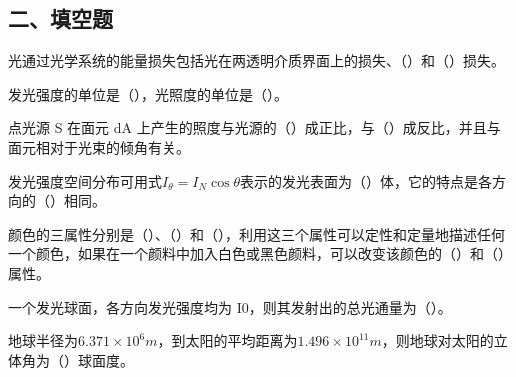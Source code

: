 \documentclass[standard, analysis, notocnum]{ExBook}
\newcommand{\answerarea}[1][8cm]{%
  \par\vspace{2mm}%
  \noindent{\color{themeColor!35}\rule{\linewidth}{0.4pt}}\par
  \noindent\begin{minipage}[t][#1][t]{\linewidth}\vspace{0pt}\end{minipage}\par
  \noindent{\color{themeColor!35}\rule{\linewidth}{0.4pt}}\par
}
\begin{document}
\subsection{二、填空题}
\begin{qitems}
\begin{bbox}
\qitem 光通过光学系统的能量损失包括光在两透明介质界面上的损失、（\hspace{1.6em}）和（\hspace{1.6em}）损失。
\answerarea[3.5cm]
\end{bbox}
\begin{bbox}
\qitem 发光强度的单位是（\hspace{1.6em}），光照度的单位是（\hspace{1.6em}）。
\answerarea[3.5cm]
\end{bbox}
\begin{bbox}
\qitem 点光源 S 在面元 dA 上产生的照度与光源的（\hspace{1.6em}）成正比，与（\hspace{1.6em}）成反比，并且与面元相对于光束的倾角有关。
\answerarea[3.5cm]
\end{bbox}
\begin{bbox}
\qitem 发光强度空间分布可用式$I_{\theta}=I_{N}\cos \theta$表示的发光表面为（\hspace{1.6em}）体，它的特点是各方向的（\hspace{1.6em}）相同。
\answerarea[3.5cm]
\end{bbox}
\begin{bbox}
\qitem 颜色的三属性分别是（\hspace{1.6em}）、（\hspace{1.6em}）和（\hspace{1.6em}），利用这三个属性可以定性和定量地描述任何一个颜色，如果在一个颜料中加入白色或黑色颜料，可以改变该颜色的（\hspace{1.6em}）和（\hspace{1.6em}）属性。
\answerarea[3.5cm]
\end{bbox}
\begin{bbox}
\qitem 一个发光球面，各方向发光强度均为 I0，则其发射出的总光通量为（\hspace{1.6em}）。
\answerarea[3.5cm]
\end{bbox}
\begin{bbox}
\qitem 地球半径为$6.371\times 10^{6}m$，到太阳的平均距离为$1.496\times 10^{11}m$，则地球对太阳的立体角为（\hspace{1.6em}）球面度。
\answerarea[3.5cm]
\end{bbox}

\end{qitems}
\end{document}
